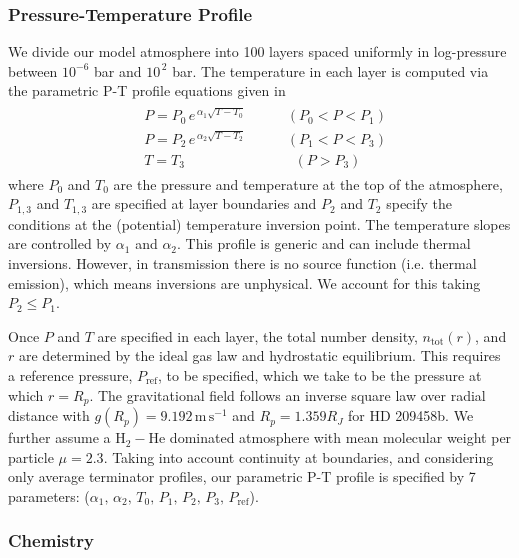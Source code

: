\documentclass[fleqn,usenatbib]{mnras}
\begin{document}
\subsubsection{Pressure-Temperature Profile}\label{subsubsec:pt_profile}

We divide our model atmosphere into 100 layers spaced uniformly in log-pressure between $10^{-6}$ bar and $10^{\, 2}$ bar. The temperature in each layer is computed via the parametric P-T profile equations given in \citet{Madhusudhan2009}
%
\begin{align}
\begin{split}
& P = P_{0} \, e^{\, \alpha_1 \sqrt{T-T_0}} \hspace{35pt} (P_0<P<P_1) \\
& P = P_{2} \, e^{\, \alpha_2 \sqrt{T-T_2}} \hspace{35pt} (P_1<P<P_3) \\
& T = T_3 \hspace{94pt} (P>P_3) 
\label{eqn:P-T}
\end{split}
\end{align}
%
where $P_{0}$ and $T_{0}$ are the pressure and temperature at the top of the atmosphere, $P_{1,3}$ and $T_{1,3}$ are specified at layer boundaries and $P_{2}$ and $T_{2}$ specify the conditions at the (potential) temperature inversion point. The temperature slopes are controlled by $\alpha_1$ and $\alpha_2$. This profile is generic and can include thermal inversions. However, in transmission there is no source function (i.e. thermal emission), which means inversions are unphysical. We account for this taking $P_{2} \leq P_{1}$.

Once $P$ and $T$ are specified in each layer, the total number density, $n_{\mathrm{tot}}(r)$, and $r$ are determined by the ideal gas law and hydrostatic equilibrium. This requires a reference pressure, $P_{\mathrm{ref}}$, to be specified, which we take to be the pressure at which $r=R_p$. The gravitational field follows an inverse square law over radial distance with $g(R_p) = 9.192 \, \mathrm{m \, s^{-1}}$ and $R_p = 1.359 R_J$ for HD 209458b. We further assume a $\mathrm{H}_{2}-\mathrm{He}$ dominated atmosphere with mean molecular weight per particle $\mu=2.3$. Taking into account continuity at boundaries, and considering only average terminator profiles, our parametric P-T profile is specified by 7 parameters: ($\alpha_1, \, \alpha_2, \, T_0, \, P_1, \, P_2, \, P_3, \, P_{\mathrm{ref}}$).

\subsubsection{Chemistry}\label{subsubsec:chemistry}
\end{document}
